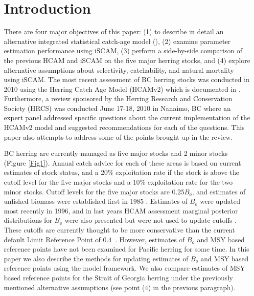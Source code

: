 

\section{Introduction}
	
There are four major objectives of this paper: (1) to describe in detail an alternative integrated statistical catch-age model (\iscam), (2) examine parameter estimation performance using iSCAM, (3) perform a side-by-side comparison of the previous HCAM and iSCAM on the five major herring stocks, and (4) explore alternative assumptions about selectivity, catchability, and natural mortality using iSCAM.  The most recent assessment of BC herring stocks was conducted in 2010 using the Herring Catch Age Model (HCAMv2) which is documented in \cite{Clear2010}.  Furthermore, a review sponsored by the Herring Research and Conservation Society (HRCS) was conducted June 17-18, 2010 in Nanaimo, BC where an expert panel addressed specific questions about the current implementation of the HCAMv2 model and suggested recommendations for each of the questions.  This paper also attempts to address some of the points brought up in the review.

BC herring are currently managed as five major stocks and 2 minor stocks (Figure \ref{Fig1}).  Annual catch advice for each of these areas is based on current estimates of stock status, and a 20\% exploitation rate if the stock is above the cutoff level for the five major stocks and a 10\% exploitation rate for the two minor stocks.  Cutoff levels for the five major stocks are  0.25$B_o$, and estimates of unfished biomass were established first in 1985 \citep{haist1986stock}.  Estimates of $B_o$ were updated most recently in 1996, and in last years HCAM assessment marginal posterior distributions for $B_o$ were also presented but were not used to update cutoffs \citep{Clear2010}.  These cutoffs are currently thought to be more conservative 	than the current default Limit Reference Point of 0.4\bmsy\ \citep{dfo2006}. However, estimates of $B_o$ and MSY based reference points have not been examined for Pacific herring for some time.  In this paper we also describe the methods for updating estimates of $B_o$ and MSY based reference points using the \iscam model framework.  We also compare estimates of MSY based reference points for the Strait of Georgia herring under the previously mentioned alternative assumptions (see point (4) in the previous paragraph).

